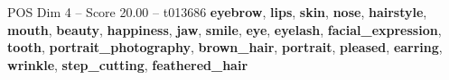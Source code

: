 \begin{textsample}{POS Dim 4 – Score 20.00 – t013686}  \label{ex:f4_pos_021}
\textbf{eyebrow}, \textbf{lips}, \textbf{skin}, \textbf{nose}, \textbf{hairstyle}, \textbf{mouth}, \textbf{beauty}, \textbf{happiness}, \textbf{jaw}, \textbf{smile}, \textbf{eye}, \textbf{eyelash}, \textbf{facial\_expression}, \textbf{tooth}, \textbf{portrait\_photography}, \textbf{brown\_hair}, \textbf{portrait}, \textbf{pleased}, \textbf{earring}, \textbf{wrinkle}, \textbf{step\_cutting}, \textbf{feathered\_hair}

\end{textsample}
